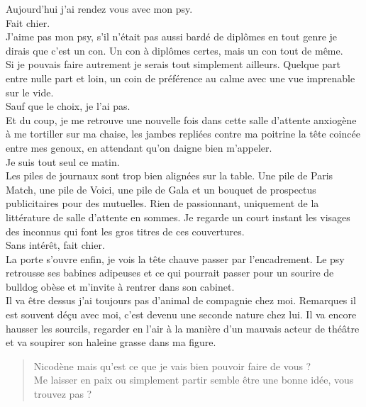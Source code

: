 Aujourd'hui j'ai rendez vous avec mon psy. \\

Fait chier. \\

J'aime pas mon psy, s'il n'était pas aussi bardé de diplômes en tout genre je dirais que c'est un con. Un con à diplômes certes, mais un con tout de même. \\

Si je pouvais faire autrement je serais tout simplement ailleurs. Quelque part entre nulle part et loin, un coin de préférence au calme avec une vue imprenable sur le vide.\\

Sauf que le choix, je l'ai pas. \\
Et du coup, je me retrouve une nouvelle fois dans cette salle d'attente anxiogène à me tortiller sur ma chaise, les jambes repliées contre ma poitrine la tête coincée entre mes genoux, en attendant qu'on daigne bien m'appeler. \\

Je suis tout seul ce matin. \\

Les piles de journaux sont trop bien alignées sur la table. Une pile de Paris Match, une pile de Voici, une pile de Gala et un bouquet de prospectus publicitaires pour des mutuelles. Rien de passionnant, uniquement de la littérature de salle d'attente en sommes. Je regarde un court instant les visages des inconnus qui font les gros titres de ces couvertures.\\

Sans intérêt, fait chier. \\

La porte s'ouvre enfin, je vois la tête chauve passer par l'encadrement. Le psy retrousse ses babines adipeuses et ce qui pourrait passer pour un sourire de bulldog obèse et m'invite à rentrer dans son cabinet. \\
Il va être dessus j'ai toujours pas d'animal de compagnie chez moi. Remarques il est souvent déçu avec moi, c'est devenu une seconde nature chez lui. Il va encore hausser les sourcils, regarder en l'air à la manière d'un mauvais acteur de théâtre et va soupirer son haleine grasse dans ma figure. \\

\begin{quote}
  Nicodène mais qu'est ce que je vais bien pouvoir faire de vous ? \\
  Me laisser en paix ou simplement partir semble être une bonne idée, vous trouvez pas ?\\
\end{quote}

